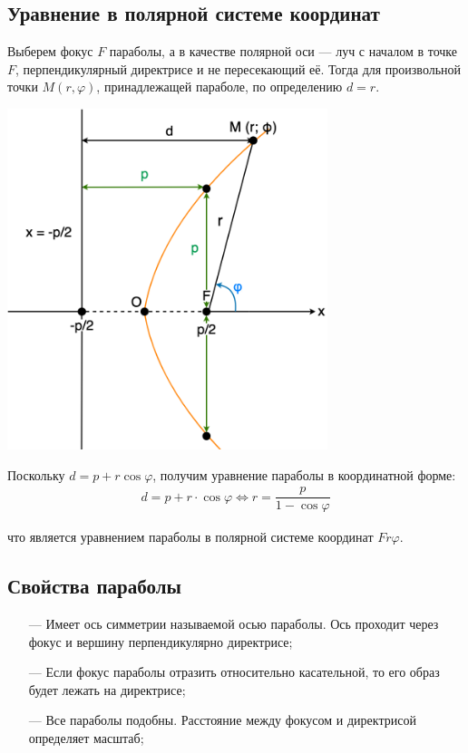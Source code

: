 \documentclass[a4paper,12pt]{extbook}
\theoremstyle{numbered}
\theoremstyle{named}
\theoremstyle{named}
\theoremstyle{named}
\begin{document}
\subsection*{Уравнение в полярной системе координат}

Выберем фокус \(F\) параболы, а в качестве полярной оси — луч с началом в точке \(F\), перпендикулярный директрисе и не пересекающий её.
Тогда для произвольной точки \(M(r, \varphi)\), принадлежащей параболе, по определению \(d = r\).

\begin{center}
    \includegraphics[width=0.7\textwidth]{parabola2.png}
\end{center}

Поскольку \(d = p + r\cos{\varphi}\), получим уравнение параболы в координатной форме:
\begin{gather*}
    d = p + r \cdot \cos{\varphi}  \iff r = \dfrac{p}{1 - \cos{\varphi}}
\end{gather*}

что является уравнением параболы в полярной системе координат \(Fr\varphi\).

\subsection*{Свойства параболы}

\begin{itemize}
    \item[—]{Имеет ось симметрии называемой осью параболы. Ось проходит через фокус и вершину перпендикулярно директрисе;}
    \item[—]{Если фокус параболы отразить относительно касательной, то его образ будет лежать на директрисе;}
    \item[—]{Все параболы подобны. Расстояние между фокусом и директрисой определяет масштаб;}
\end{itemize}
\end{document}
